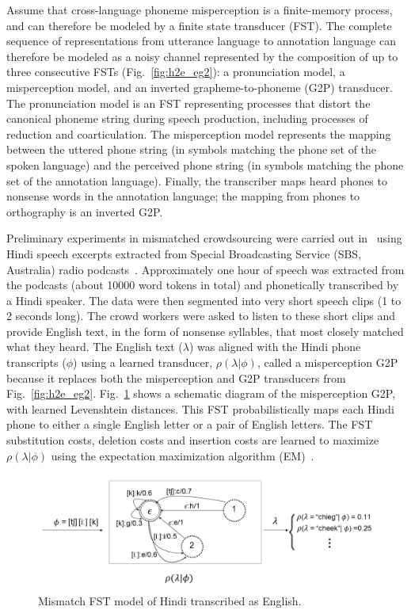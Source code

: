 Assume that cross-language phoneme misperception is a finite-memory
process, and can therefore be modeled by a finite state transducer
(FST).  The complete sequence of representations from utterance
language to annotation language can therefore be modeled as a noisy
channel represented by the composition of up to three consecutive FSTs
(Fig.~\ref{fig:h2e_eg2}): a pronunciation model, a misperception
model, and an inverted grapheme-to-phoneme (G2P) transducer.  The
pronunciation model is an FST representing processes that distort the
canonical phoneme string during speech production, including processes
of reduction and coarticulation.  The misperception model represents
the mapping between the uttered phone string (in symbols matching the
phone set of the spoken language) and the perceived phone string (in
symbols matching the phone set of the annotation language).  Finally,
the transcriber maps heard phones to nonsense words in the annotation
language; the mapping from phones to orthography is an inverted G2P.

Preliminary experiments in mismatched crowdsourcing were carried out
in~\cite{JHJ15a} using Hindi speech excerpts extracted from Special
Broadcasting Service (SBS, Australia) radio podcasts~\cite{SBS}.
Approximately one hour of speech was extracted from the podcasts
(about 10000 word tokens in total) and phonetically transcribed by a
Hindi speaker. The data were then segmented into very short speech
clips (1 to 2 seconds long). The crowd workers were asked to listen to
these short clips and provide English text, in the form of nonsense
syllables, that most closely matched what they heard. The English text
($\lambda$) was aligned with the Hindi phone transcripts ($\phi$)
using a learned transducer, $\rho(\lambda|\phi)$, called a
misperception G2P because it replaces both the misperception and G2P
transducers from Fig.~\ref{fig:h2e_eg2}.  Fig.~\ref{fig:channelfst}
shows a schematic diagram of the misperception G2P, with learned
Levenshtein distances. This FST probabilistically maps each Hindi
phone to either a single English letter or a pair of English
letters. The FST substitution costs, deletion costs and insertion
costs are learned to maximize $\rho(\lambda|\phi)$ using the expectation
maximization algorithm (EM)~\cite{Dempster77}.

\begin{figure}[b!]
\centering
\includegraphics[width=\linewidth]{../figs/mismatchfst.png}
\caption{Mismatch FST model of Hindi transcribed as English.\label{fig:channelfst}}
\end{figure}

